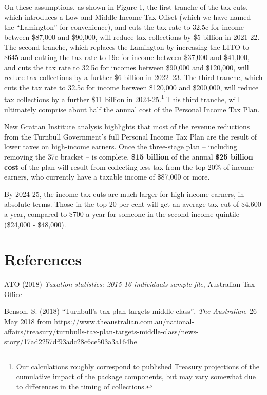 \documentclass[submission]{grattan}\usepackage[]{graphicx}\usepackage[]{color}
\begin{document}
On these assumptions, as shown in Figure 1, the first tranche of the tax cuts, which introduces a Low and Middle Income Tax Offset (which we have named the ``Lamington'' for convenience), and cuts the tax rate to 32.5c for income between \$87,000 and \$90,000, will reduce tax collections by \$5 billion in 2021-22. The second tranche, which replaces the Lamington by increasing the LITO to \$645 and cutting the tax rate to 19c for income between \$37,000 and \$41,000, and cuts the tax rate to 32.5c for incomes between \$90,000 and \$120,000, will reduce tax collections by a further \$6 billion in 2022--23. The third tranche, which cuts the tax rate to 32.5c for income between \$120,000 and \$200,000, will reduce tax collections by a further \$11 billion in 2024-25.\footnote{Our calculations roughly correspond to published Treasury projections of the cumulative impact of the package components, but may vary somewhat due to differences in the timing of collections.} This third tranche, will ultimately comprise about half the annual cost of the Personal Income Tax Plan.

New Grattan Institute analysis highlights that most of the revenue reductions from the Turnbull Government's full Personal Income Tax Plan are the result of lower taxes on high-income earners. Once the three-stage plan -- including removing the 37c bracket -- is complete, \textbf{\$15 billion} of the annual \textbf{\$25 billion cost} of the plan will result from collecting less tax from the top 20\% of income earners, who currently have a taxable income of \$87,000 or more.



By 2024-25, the income tax cuts are much larger for high-income earners, in absolute terms. Those in the top 20 per cent will get an average tax cut of \$4,600 a year, compared to \$700 a year for someone in the second income quintile (\$24,000 - \$48,000).



\chapter{References}\label{chap:references}

ATO (2018) \emph{Taxation statistics: 2015-16 individuals sample file}, Australian Tax Office

Benson, S. (2018) ``Turnbull's tax plan targets middle class'', \emph{The Australian}, 26 May 2018 from \url{https://www.theaustralian.com.au/national-affairs/treasury/turnbulls-tax-plan-targets-middle-class/news-story/17ad2257df93adc28c6ce503a3a164be}
\end{document}
